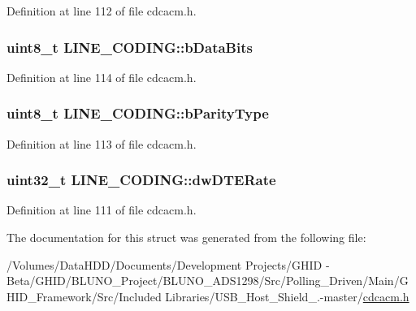 \-Definition at line 112 of file cdcacm.\-h.

\hypertarget{struct_l_i_n_e___c_o_d_i_n_g_a2c360b6f874f2cf45f95492f9e6c1812}{
\subsubsection[{b\-Data\-Bits}]{\setlength{\rightskip}{0pt plus 5cm}uint8\-\_\-t {\bf \-L\-I\-N\-E\-\_\-\-C\-O\-D\-I\-N\-G\-::b\-Data\-Bits}}}\label{struct_l_i_n_e___c_o_d_i_n_g_a2c360b6f874f2cf45f95492f9e6c1812}


\-Definition at line 114 of file cdcacm.\-h.

\hypertarget{struct_l_i_n_e___c_o_d_i_n_g_ad14985344c9e31a210999dfa0b4ccc42}{
\subsubsection[{b\-Parity\-Type}]{\setlength{\rightskip}{0pt plus 5cm}uint8\-\_\-t {\bf \-L\-I\-N\-E\-\_\-\-C\-O\-D\-I\-N\-G\-::b\-Parity\-Type}}}\label{struct_l_i_n_e___c_o_d_i_n_g_ad14985344c9e31a210999dfa0b4ccc42}


\-Definition at line 113 of file cdcacm.\-h.

\hypertarget{struct_l_i_n_e___c_o_d_i_n_g_ae9fd7d7247b4c50df89a6dd5ed955073}{
\subsubsection[{dw\-D\-T\-E\-Rate}]{\setlength{\rightskip}{0pt plus 5cm}uint32\-\_\-t {\bf \-L\-I\-N\-E\-\_\-\-C\-O\-D\-I\-N\-G\-::dw\-D\-T\-E\-Rate}}}\label{struct_l_i_n_e___c_o_d_i_n_g_ae9fd7d7247b4c50df89a6dd5ed955073}


\-Definition at line 111 of file cdcacm.\-h.



\-The documentation for this struct was generated from the following file\-:\begin{DoxyCompactItemize}
\item 
/\-Volumes/\-Data\-H\-D\-D/\-Documents/\-Development Projects/\-G\-H\-I\-D -\/ Beta/\-G\-H\-I\-D/\-B\-L\-U\-N\-O\-\_\-\-Project/\-B\-L\-U\-N\-O\-\_\-\-A\-D\-S1298/\-Src/\-Polling\-\_\-\-Driven/\-Main/\-G\-H\-I\-D\-\_\-\-Framework/\-Src/\-Included Libraries/\-U\-S\-B\-\_\-\-Host\-\_\-\-Shield\-\_.-\/master/\hyperlink{cdcacm_8h}{cdcacm.\-h}\end{DoxyCompactItemize}
